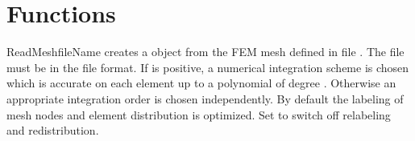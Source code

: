 
\section{Functions}
\begin{funcdesc}{ReadMesh}{fileName }
creates a \Domain object from the FEM mesh defined in file .
The file must be in the \finley file format.
If  is positive, a numerical integration scheme is chosen
which is accurate on each element up to a polynomial of degree
.
Otherwise an appropriate integration order is chosen independently.
By default the labeling of mesh nodes and element distribution is optimized.
Set  to switch off relabeling and redistribution.
\end{funcdesc}

